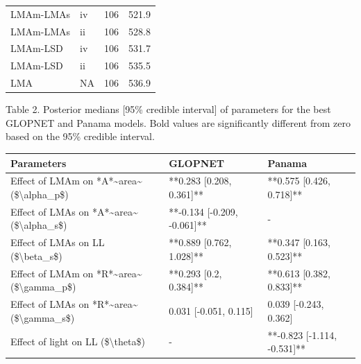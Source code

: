 \documentclass[
  12pt,
  letterpaper,
  DIV=11,
  numbers=noendperiod]{scrartcl}
\providecommand{\DIFadd}[1]{{\protect\color{blue}\uwave{#1}}} %
\providecommand{\DIFaddbegin}{} %
\newcommand{\DIFaddincludegraphics}[2][]{{\color{blue}\fbox{\DIFOincludegraphics[#1]{#2}}}} %
\DeclareRobustCommand{\DIFaddbegin}{\DIFOaddbegin \let\includegraphics\DIFaddincludegraphics} %
\begin{document}
\begin{table}
\begin{tabular}{llrr}
\hspace{1em}LMAm-LMAs & iv & 106 & 521.9\\
\hspace{1em}LMAm-LMAs & ii & 106 & 528.8\\
\hspace{1em}LMAm-LSD & iv & 106 & 531.7\\
\hspace{1em}LMAm-LSD & ii & 106 & 535.5\\
\hspace{1em}LMA & NA & 106 & 536.9\\
\bottomrule
\end{tabular}
\end{table}

\newpage

Table 2. Posterior medians {[}95\% credible interval{]} of parameters
for the best GLOPNET and Panama models. Bold values are significantly
different from zero based on the 95\% credible interval.

\begin{longtable*}[t]{lll}
\toprule
Parameters & GLOPNET & Panama\\
\midrule
Effect of LMAm on *A*\textasciitilde{}area\textasciitilde{} (\$\textbackslash{}alpha\_p\$) & **0.283 [0.208, 0.361]** & **0.575 [0.426, 0.718]**\\
Effect of LMAs on *A*\textasciitilde{}area\textasciitilde{} (\$\textbackslash{}alpha\_s\$) & **-0.134 [-0.209, -0.061]** & -\\
Effect of LMAs on LL (\$\textbackslash{}beta\_s\$) & **0.889 [0.762, 1.028]** & **0.347 [0.163, 0.523]**\\
Effect of LMAm on *R*\textasciitilde{}area\textasciitilde{} (\$\textbackslash{}gamma\_p\$) & **0.293 [0.2, 0.384]** & **0.613 [0.382, 0.833]**\\
Effect of LMAs on *R*\textasciitilde{}area\textasciitilde{} (\$\textbackslash{}gamma\_s\$) & 0.031 [-0.051, 0.115] & 0.039 [-0.243, 0.362]\\
\addlinespace
Effect of light on LL (\$\textbackslash{}theta\$) & - & **-0.823 [-1.114, -0.531]**\\
\bottomrule
\end{longtable*}

\newpage

\DIFaddbegin \section{\DIFadd{Figure legends}}\label{figure-legends}
\end{document}
